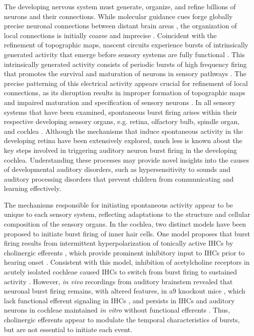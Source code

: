 \documentclass[9pt,lineno]{elife}
\begin{document}
The developing nervous system must generate, organize, and refine billions of neurons and their connections. While molecular guidance cues forge globally precise neuronal connections between distant brain areas \citep{Stoeckli2018,Dickson2002}, the organization of local connections is initially coarse and imprecise \citep{Dhande2011,Kirkby2013,Sretavan1986}. Coincident with the refinement of topographic maps, nascent circuits experience bursts of intrinsically generated activity that emerge before sensory systems are fully functional \citep{Kirkby2013}. This intrinsically generated activity consists of periodic bursts of high frequency firing that promotes the survival and maturation of neurons in sensory pathways \citep{Blankenship2010, Moody2005}. The precise patterning of this electrical activity appears crucial for refinement of local connections, as its disruption results in improper formation of topographic maps \citep{Anton-Bolanos2019,Burbridge2014,Xu2011} and impaired maturation and specification of sensory neurons \citep{Shrestha2018b,Sun2018}. In all sensory systems that have been examined, spontaneous burst firing arises within their respective developing sensory organs, e.g. retina, olfactory bulb, spindle organ, and cochlea \citep{Blankenship2010}. Although the mechanisms that induce spontaneous activity in the developing retina have been extensively explored, much less is known about the key steps involved in triggering auditory neuron burst firing in the developing cochlea. Understanding these processes may provide novel insights into the causes of developmental auditory disorders, such as hypersensitivity to sounds and auditory processing disorders that prevent children from communicating and learning effectively.

The mechanisms responsible for initiating spontaneous activity appear to be unique to each sensory system, reflecting adaptations to the structure and cellular composition of the sensory organs. In the cochlea, two distinct models have been proposed to initiate burst firing of inner hair cells. One model proposes that burst firing results from intermittent hyperpolarization of tonically active IHCs by cholinergic efferents \citep{Johnson2011, Wang2014}, which provide prominent inhibitory input to IHCs prior to hearing onset \citep{Glowatzki2000}. Consistent with this model, inhibition of acetylcholine receptors in acutely isolated cochleae caused IHCs to switch from burst firing to sustained activity \citep{Johnson2011}. However, \textit{in vivo} recordings from auditory brainstem revealed that neuronal burst firing remains, with altered features, in a9 knockout mice \citep{Clause2014}, which lack functional efferent signaling in IHCs \citep{Johnson2013}, and persists in IHCs and auditory neurons in cochleae maintained \textit{in vitro} without functional efferents \citep{Johnson2013}. Thus, cholinergic efferents appear to modulate the temporal characteristics of bursts, but are not essential to initiate each event. 
\end{document}
